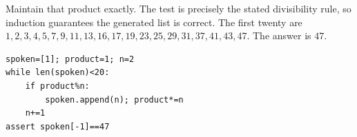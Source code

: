 Maintain that product exactly. The test is precisely the stated divisibility rule, so induction guarantees the generated list is correct. The first twenty are $1,2,3,4,5,7,9,11,13,16,17,19,23,25,29,31,37,41,43,47$. The answer is $\boxed{47}$.
\begin{verbatim}
spoken=[1]; product=1; n=2
while len(spoken)<20:
    if product%n:
        spoken.append(n); product*=n
    n+=1
assert spoken[-1]==47
\end{verbatim}
